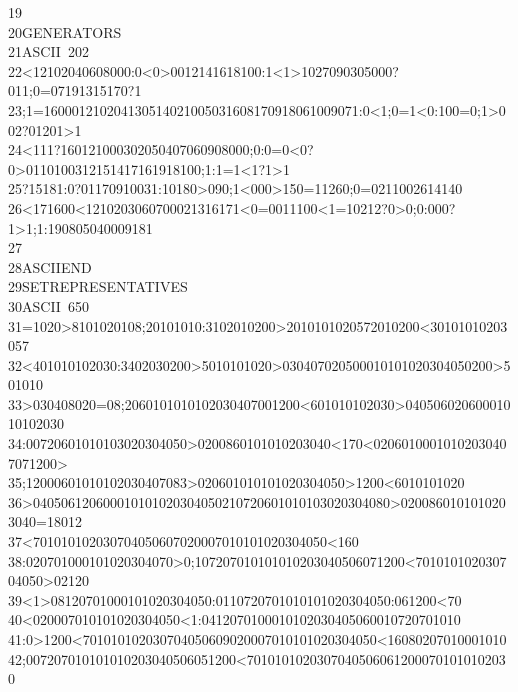 \begin{tabbing}
19\>\\[-7pt]
20\>GENERATORS\\[-7pt]
21\>ASCII\ 202\\[-7pt]
22<12102040608000:0<0>0012141618100:1<1>1027090305000?011;0=07191315170?1\\[-7pt]
23;1=160001210204130514021005031608170918061009071:0<1;0=1<0:100=0;1>002?01201>1\\[-7pt]
24\><111?160121000302050407060908000;0:0=0<0?0>0110100312151417161918100;1:1=1<1?1>1\\[-7pt]
25?15181:0?01170910031:10180>090;1<000>150=11260;0=0211002614140\\[-7pt]
26\><171600<1210203060700021316171<0=0011100<1=10212?0>0;0:000?1>1;1:190805040009181\\[-7pt]
27\\[-7pt]
28\>ASCIIEND\\[-7pt]
29\>SETREPRESENTATIVES\\[-7pt]
30\>ASCII\ 650\\[-7pt]
31=1020>8101020108;20101010:3102010200>2010101020572010200<30101010203057\\[-7pt]
32<401010102030:3402030200>5010101020>030407020500010101020304050200>501010\\[-7pt]
33>030408020=08;2060101010102030407001200<601010102030>04050602060001010102030\\[-7pt]
34:00720601010103020304050>0200860101010203040<170<02060100010102030407071200>\\[-7pt]
35;12000601010102030407083>020601010101020304050>1200<6010101020\\[-7pt]
36>040506120600010101020304050210720601010103020304080>0200860101010203040=18012\\[-7pt]
37<701010102030704050607020007010101020304050<160\\[-7pt]
38\>:020701000101020304070>0;107207010101010203040506071200<701010102030704050>02120\\[-7pt]
39<1>08120701000101020304050:0110720701010101020304050:061200<70\\[-7pt]
40<020007010101020304050<1:0412070100010102030405060010720701010\\[-7pt]
41:0>1200<701010102030704050609020007010101020304050<16080207010001010\\[-7pt]
42;007207010101010203040506051200<70101010203070405060612000701010102030\\[-7pt]

\end{tabbing}
